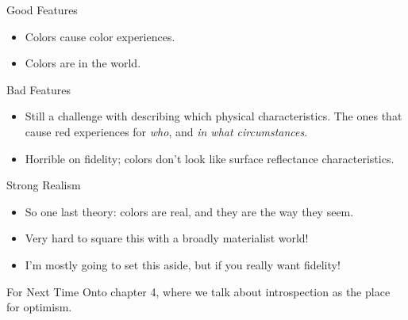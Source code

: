\documentclass[
  17pt,
  letterpaper,
  ignorenonframetext,
  aspectratio=169,
  handout]{beamer}
\providecommand{\tightlist}{%
  \setlength{\itemsep}{0pt}\setlength{\parskip}{0pt}}\usepackage{longtable,booktabs,array}
\begin{document}
\begin{frame}{Good Features}
\protect\hypertarget{good-features}{}
\begin{itemize}[<+->]
\tightlist
\item
  Colors cause color experiences.
\item
  Colors are in the world.
\end{itemize}
\end{frame}

\begin{frame}{Bad Features}
\protect\hypertarget{bad-features}{}
\begin{itemize}[<+->]
\tightlist
\item
  Still a challenge with describing which physical characteristics. The
  ones that cause red experiences for \emph{who}, and \emph{in what
  circumstances}.
\item
  Horrible on fidelity; colors don't look like surface reflectance
  characteristics.
\end{itemize}
\end{frame}

\begin{frame}{Strong Realism}
\protect\hypertarget{strong-realism}{}
\begin{itemize}[<+->]
\tightlist
\item
  So one last theory: colors are real, and they are the way they seem.
\item
  Very hard to square this with a broadly materialist world!
\item
  I'm mostly going to set this aside, but if you really want fidelity!
\end{itemize}
\end{frame}

\begin{frame}{For Next Time}
\protect\hypertarget{for-next-time}{}
Onto chapter 4, where we talk about introspection as the place for
optimism.
\end{frame}
\end{document}
